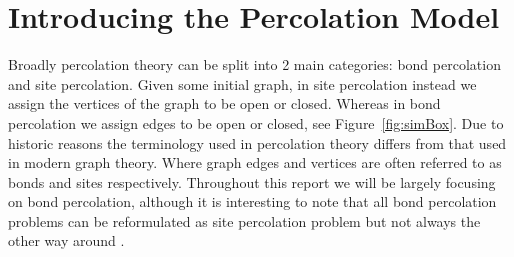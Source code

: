 \documentclass[a4paper,11pt]{article}
\theoremstyle{definition}
\begin{document}

	

\section{Introducing the Percolation Model}
Broadly percolation theory can be split into 2 main categories: bond percolation and site percolation. Given some initial graph, in site percolation instead we assign the vertices of the graph to be open or closed. Whereas in bond percolation we assign edges to be open or closed, see Figure~\ref{fig:simBox}. Due to historic reasons the terminology used in percolation theory differs from that used in modern graph theory. Where graph edges and vertices are often referred to as bonds and sites respectively. Throughout this report we will be largely focusing on bond percolation, although it is interesting to note that all bond percolation problems can be reformulated as site percolation problem but not always the other way around \cite{grimmett1999percolation}.
\end{document}
